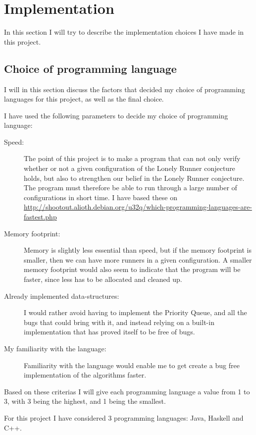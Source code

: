\section{Implementation}
\label{implementation}

In this section I will try to describe the implementation choices I have made in this project.


\subsection{Choice of programming language}
I will in this section discuss the factors that decided my choice of programming languages for this project, as well as the final choice.

I have used the following parameters to decide my choice of programming language:
\begin{description}
\item[Speed:] The point of this project is to make a program that can not only verify whether or not a given configuration of the Lonely Runner conjecture holds, but also to strengthen our belief in the Lonely Runner conjecture. The program must therefore be able to run through a large number of configurations in short time. I have based these on \url{http://shootout.alioth.debian.org/u32q/which-programming-languages-are-fastest.php}
\item[Memory footprint:] Memory is slightly less essential than speed, but if the memory footprint is smaller, then we can have more runners in a given configuration. A smaller memory footprint would also seem to indicate that the program will be faster, since less has to be allocated and cleaned up. 
\item[Already implemented data-structures:] I would rather avoid having to implement the Priority Queue, and all the bugs that could bring with it, and instead relying on a built-in implementation that has proved itself to be free of bugs.
\item[My familiarity with the language:] Familiarity with the language would enable me to get create a bug free implementation of the algorithms faster.
\end{description}

Based on these criterias I will give each programming language a value from 1 to 3, with 3 being the highest, and 1 being the smallest. 

For this project I have considered 3 programming languages: Java, Haskell and C++.

